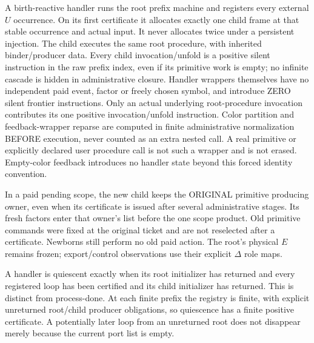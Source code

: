 \documentclass[11pt]{article}
\begin{document}
A birth-reactive handler runs the root prefix machine and registers every external $U$ occurrence. On its first certificate it allocates exactly one child frame at that stable occurrence and actual input. It never allocates twice under a persistent injection. The child executes the same root procedure, with inherited binder/producer data. Every child invocation/unfold is a positive silent instruction in the raw prefix index, even if its primitive work is empty; no infinite cascade is hidden in administrative closure. Handler wrappers themselves have no independent paid event, factor or freely chosen symbol, and introduce ZERO silent frontier instructions. Only an actual underlying root-procedure invocation contributes its one positive invocation/unfold instruction. Color partition and feedback-wrapper reparse are computed in finite administrative normalization BEFORE execution, never counted as an extra nested call. A real primitive or explicitly declared user procedure call is not such a wrapper and is not erased. Empty-color feedback introduces no handler state beyond this forced identity convention.

In a paid pending scope, the new child keeps the ORIGINAL primitive producing owner, even when its certificate is issued after several administrative stages. Its fresh factors enter that owner's list before the one scope product. Old primitive commands were fixed at the original ticket and are not reselected after a certificate. Newborns still perform no old paid action. The root's physical $E$ remains frozen; export/control observations use their explicit $\Delta$ role maps.

A handler is quiescent exactly when its root initializer has returned and every registered loop has been certified and its child initializer has returned. This is distinct from process-done. At each finite prefix the registry is finite, with explicit unreturned root/child producer obligations, so quiescence has a finite positive certificate. A potentially later loop from an unreturned root does not disappear merely because the current port list is empty.
\end{document}
